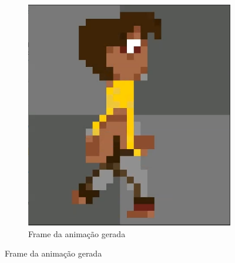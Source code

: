 \begin{figure}[htbp]
\begin{subfigure}{0.35\linewidth}
        \includegraphics[width=1\linewidth]{figs/pixelLab/dia4/print4.PNG}
        \caption{\small Frame da animação gerada}
        \label{fig:pixelLabAnimacao9b}
    \end{subfigure}
\end{figure}


